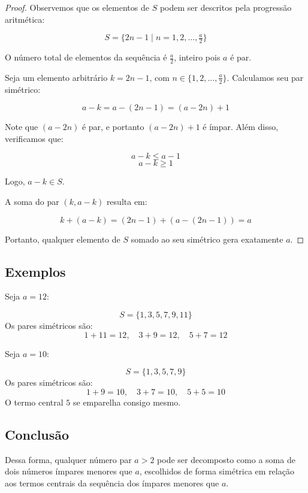 \documentclass[a4paper,11pt]{article}
\theoremstyle{definition}
\theoremstyle{remark}
\begin{document}
	
	\begin{proof}
		Observemos que os elementos de $S$ podem ser descritos pela progressão aritmética:
		
		\[
		S = \{2n - 1 \mid n = 1, 2, \dotsc, \tfrac{a}{2} \}
		\]
		
		O número total de elementos da sequência é $\tfrac{a}{2}$, inteiro pois $a$ é par.
		
		Seja um elemento arbitrário $k = 2n - 1$, com $n \in \{1, 2, \dotsc, \tfrac{a}{2}\}$. Calculamos seu par simétrico:
		
		\[
		a - k = a - (2n - 1) = (a - 2n) + 1
		\]
		
		Note que $(a - 2n)$ é par, e portanto $(a - 2n) + 1$ é ímpar. Além disso, verificamos que:
		
		\[
		a - k \leq a - 1
		\]
		\[
		a - k \geq 1
		\]
		
		Logo, $a - k \in S$.
		
		A soma do par $(k, a - k)$ resulta em:
		
		\[
		k + (a - k) = (2n - 1) + (a - (2n - 1)) = a
		\]
		
		Portanto, qualquer elemento de $S$ somado ao seu simétrico gera exatamente $a$.
		
	\end{proof}
	
	\subsection*{Exemplos}
	
	Seja $a = 12$:
	
	\[
	S = \{1, 3, 5, 7, 9, 11\}
	\]
	Os pares simétricos são:
	\[
	1 + 11 = 12, \quad 3 + 9 = 12, \quad 5 + 7 = 12
	\]
	
	Seja $a = 10$:
	
	\[
	S = \{1, 3, 5, 7, 9\}
	\]
	Os pares simétricos são:
	\[
	1 + 9 = 10, \quad 3 + 7 = 10, \quad 5 + 5 = 10
	\]
	O termo central $5$ se emparelha consigo mesmo.
	
	\subsection*{Conclusão}
	
	Dessa forma, qualquer número par $a > 2$ pode ser decomposto como a soma de dois números ímpares menores que $a$, escolhidos de forma simétrica em relação aos termos centrais da sequência dos ímpares menores que $a$.
		
	\vspace{1cm}
	
\end{document}
